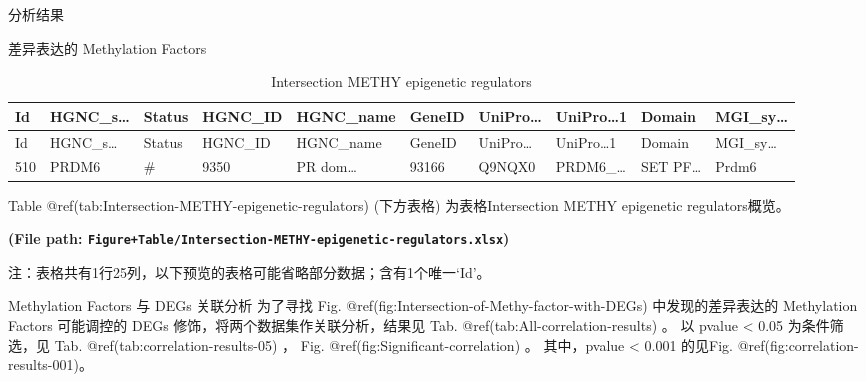 \documentclass[
  ignorenonframetext,
]{beamer}
\begin{document}
\begin{frame}[fragile]{分析结果}
\begin{block}{差异表达的 Methylation Factors}
\begin{longtable}[]{@{}llllllllll@{}}
\caption{Intersection METHY epigenetic regulators}\tabularnewline
\toprule
Id & HGNC\_s\ldots{} & Status & HGNC\_ID & HGNC\_name & GeneID &
UniPro\ldots{} & UniPro\ldots1 & Domain & MGI\_sy\ldots{}\tabularnewline
\midrule
\endfirsthead
\toprule
Id & HGNC\_s\ldots{} & Status & HGNC\_ID & HGNC\_name & GeneID &
UniPro\ldots{} & UniPro\ldots1 & Domain & MGI\_sy\ldots{}\tabularnewline
\midrule
\endhead
510 & PRDM6 & \# & 9350 & PR dom\ldots{} & 93166 & Q9NQX0 &
PRDM6\_\ldots{} & SET PF\ldots{} & Prdm6\tabularnewline
\bottomrule
\end{longtable}

Table @ref(tab:Intersection-METHY-epigenetic-regulators) (下方表格)
为表格Intersection METHY epigenetic regulators概览。

\textbf{(File path:
\texttt{Figure+Table/Intersection-METHY-epigenetic-regulators.xlsx})}

\begin{center}\begin{tcolorbox}[colback=gray!10, colframe=gray!50, width=0.9\linewidth, arc=1mm, boxrule=0.5pt]注：表格共有1行25列，以下预览的表格可能省略部分数据；含有1个唯一`Id'。
\end{tcolorbox}
\end{center}

\begin{center}\vspace{1.5cm}\end{center}
\end{block}

\begin{block}{Methylation Factors 与 DEGs 关联分析}
\protect\hypertarget{methylation-factors-ux4e0e-degs-ux5173ux8054ux5206ux6790}{}
为了寻找 Fig. @ref(fig:Intersection-of-Methy-factor-with-DEGs)
中发现的差异表达的 Methylation Factors 可能调控的 DEGs
修饰，将两个数据集作关联分析，结果见 Tab.
@ref(tab:All-correlation-results) 。 以 pvalue \textless{} 0.05
为条件筛选，见 Tab. @ref(tab:correlation-results-05) ， Fig.
@ref(fig:Significant-correlation) 。 其中，pvalue \textless{} 0.001
的见Fig. @ref(fig:correlation-results-001)。

\begin{center}\vspace{1.5cm}\end{center}


\end{block}
\end{frame}
\end{document}

